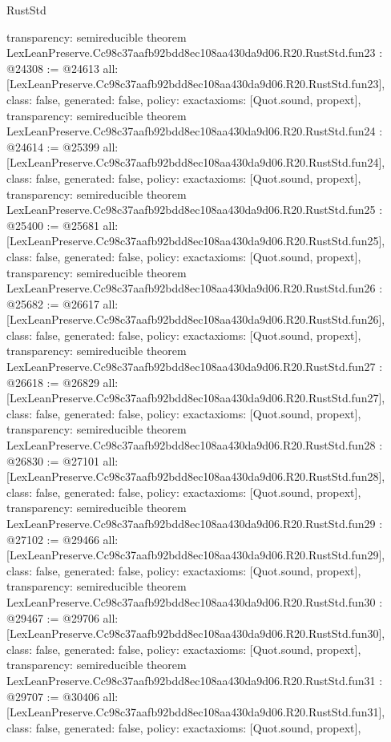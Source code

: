 \begin{lexlean}{RustStd}
\begin{coremodule}
{  transparency: semireducible
}
theorem LexLeanPreserve.Cc98c37aafb92bdd8ec108aa430da9d06.R20.RustStd.fun23 : @24308 := @24613 {
  all: [LexLeanPreserve.Cc98c37aafb92bdd8ec108aa430da9d06.R20.RustStd.fun23],
  class: false,
  generated: false,
  policy: exact{axioms: [Quot.sound, propext]},
  transparency: semireducible
}
theorem LexLeanPreserve.Cc98c37aafb92bdd8ec108aa430da9d06.R20.RustStd.fun24 : @24614 := @25399 {
  all: [LexLeanPreserve.Cc98c37aafb92bdd8ec108aa430da9d06.R20.RustStd.fun24],
  class: false,
  generated: false,
  policy: exact{axioms: [Quot.sound, propext]},
  transparency: semireducible
}
theorem LexLeanPreserve.Cc98c37aafb92bdd8ec108aa430da9d06.R20.RustStd.fun25 : @25400 := @25681 {
  all: [LexLeanPreserve.Cc98c37aafb92bdd8ec108aa430da9d06.R20.RustStd.fun25],
  class: false,
  generated: false,
  policy: exact{axioms: [Quot.sound, propext]},
  transparency: semireducible
}
theorem LexLeanPreserve.Cc98c37aafb92bdd8ec108aa430da9d06.R20.RustStd.fun26 : @25682 := @26617 {
  all: [LexLeanPreserve.Cc98c37aafb92bdd8ec108aa430da9d06.R20.RustStd.fun26],
  class: false,
  generated: false,
  policy: exact{axioms: [Quot.sound, propext]},
  transparency: semireducible
}
theorem LexLeanPreserve.Cc98c37aafb92bdd8ec108aa430da9d06.R20.RustStd.fun27 : @26618 := @26829 {
  all: [LexLeanPreserve.Cc98c37aafb92bdd8ec108aa430da9d06.R20.RustStd.fun27],
  class: false,
  generated: false,
  policy: exact{axioms: [Quot.sound, propext]},
  transparency: semireducible
}
theorem LexLeanPreserve.Cc98c37aafb92bdd8ec108aa430da9d06.R20.RustStd.fun28 : @26830 := @27101 {
  all: [LexLeanPreserve.Cc98c37aafb92bdd8ec108aa430da9d06.R20.RustStd.fun28],
  class: false,
  generated: false,
  policy: exact{axioms: [Quot.sound, propext]},
  transparency: semireducible
}
theorem LexLeanPreserve.Cc98c37aafb92bdd8ec108aa430da9d06.R20.RustStd.fun29 : @27102 := @29466 {
  all: [LexLeanPreserve.Cc98c37aafb92bdd8ec108aa430da9d06.R20.RustStd.fun29],
  class: false,
  generated: false,
  policy: exact{axioms: [Quot.sound, propext]},
  transparency: semireducible
}
theorem LexLeanPreserve.Cc98c37aafb92bdd8ec108aa430da9d06.R20.RustStd.fun30 : @29467 := @29706 {
  all: [LexLeanPreserve.Cc98c37aafb92bdd8ec108aa430da9d06.R20.RustStd.fun30],
  class: false,
  generated: false,
  policy: exact{axioms: [Quot.sound, propext]},
  transparency: semireducible
}
theorem LexLeanPreserve.Cc98c37aafb92bdd8ec108aa430da9d06.R20.RustStd.fun31 : @29707 := @30406 {
  all: [LexLeanPreserve.Cc98c37aafb92bdd8ec108aa430da9d06.R20.RustStd.fun31],
  class: false,
  generated: false,
  policy: exact{axioms: [Quot.sound, propext]},
}
\end{coremodule}
\end{lexlean}
